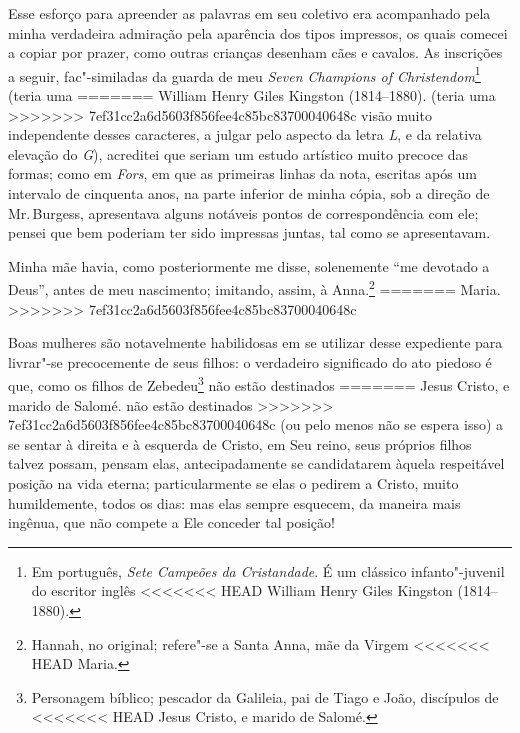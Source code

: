 {{{{{{{{{{{{%
Esse esforço para apreender as palavras em seu coletivo era
acompanhado pela minha verdadeira admiração pela aparência dos tipos
impressos, os quais comecei a copiar por prazer, como outras crianças
desenham cães e cavalos. As inscrições a seguir, fac"-similadas da guarda
de meu \textit{Seven Champions of Christendom}\footnote{Em português, \textit{Sete
  Campeões da Cristandade}. É um clássico infanto"-juvenil do escritor inglês
<<<<<<< HEAD
  William Henry Giles Kingston (1814--1880).} (teria uma
=======
  William Henry Giles Kingston (1814--1880).  (teria uma
>>>>>>> 7ef31cc2a6d5603f856fee4c85bc83700040648c
visão muito independente desses caracteres, a julgar pelo aspecto da
letra \textit{L}, e da relativa elevação do \textit{G}), acreditei que seriam um estudo
artístico muito precoce das formas; como em \textit{Fors}, em que as
primeiras linhas da nota, escritas após um intervalo de cinquenta anos,
na parte inferior de minha cópia, sob a direção de Mr.\,Burgess,
apresentava alguns notáveis pontos de correspondência com ele; pensei
que bem poderiam ter sido impressas juntas, tal como se apresentavam.

Minha mãe havia, como posteriormente me disse, solenemente ``me
devotado a Deus'', antes de meu nascimento; imitando, assim, à
Anna.\footnote{Hannah, no original; refere"-se a Santa Anna, mãe da Virgem
<<<<<<< HEAD
  Maria.}
=======
  Maria. 
>>>>>>> 7ef31cc2a6d5603f856fee4c85bc83700040648c

Boas mulheres são notavelmente habilidosas em se utilizar desse
expediente para livrar"-se precocemente de seus filhos: o verdadeiro
significado do ato piedoso é que, como os filhos de Zebedeu\footnote{Personagem
  bíblico; pescador da Galileia, pai de Tiago e João, discípulos de
<<<<<<< HEAD
  Jesus Cristo, e marido de Salomé.} não estão destinados
=======
  Jesus Cristo, e marido de Salomé.  não estão destinados
>>>>>>> 7ef31cc2a6d5603f856fee4c85bc83700040648c
(ou pelo menos não se espera isso) a se sentar à direita e à esquerda de
Cristo, em Seu reino, seus próprios filhos talvez possam, pensam elas,
antecipadamente se candidatarem àquela respeitável posição na vida
eterna; particularmente se elas o pedirem a Cristo, muito humildemente,
todos os dias: mas elas sempre esquecem, da maneira mais ingênua, que
não compete a Ele conceder tal posição!

}}}}}}}}}}}}
